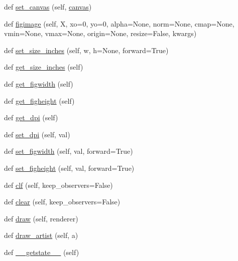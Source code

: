 \begin{DoxyCompactItemize}
\item 
def \hyperlink{classmatplotlib_1_1figure_1_1Figure_ae790b7597cbfc315342cb8dea251271a}{set\+\_\+canvas} (self, \hyperlink{classmatplotlib_1_1figure_1_1Figure_abd36f8a6998214bd3c5a359b3fed0996}{canvas})
\item 
def \hyperlink{classmatplotlib_1_1figure_1_1Figure_a4fbf405fa7586b7026a2e7e94e192c6d}{figimage} (self, X, xo=0, yo=0, alpha=None, norm=None, cmap=None, vmin=None, vmax=None, origin=None, resize=False, kwargs)
\item 
def \hyperlink{classmatplotlib_1_1figure_1_1Figure_acebcf6b8f7b0378bdd68154eb99520b2}{set\+\_\+size\+\_\+inches} (self, w, h=None, forward=True)
\item 
def \hyperlink{classmatplotlib_1_1figure_1_1Figure_a01114d214b48279bb5b81d89f0874d18}{get\+\_\+size\+\_\+inches} (self)
\item 
def \hyperlink{classmatplotlib_1_1figure_1_1Figure_a0a927243f15925482c1989829f9cfa5f}{get\+\_\+figwidth} (self)
\item 
def \hyperlink{classmatplotlib_1_1figure_1_1Figure_a04561b8cd81fbdc15ddccd20e8d8893e}{get\+\_\+figheight} (self)
\item 
def \hyperlink{classmatplotlib_1_1figure_1_1Figure_a8b61c446899e78d84ab5ac953af96805}{get\+\_\+dpi} (self)
\item 
def \hyperlink{classmatplotlib_1_1figure_1_1Figure_ac09795a9f5c841bb847e4bb96d47ac72}{set\+\_\+dpi} (self, val)
\item 
def \hyperlink{classmatplotlib_1_1figure_1_1Figure_af34fc85031256b1c3fa752afc251a5e1}{set\+\_\+figwidth} (self, val, forward=True)
\item 
def \hyperlink{classmatplotlib_1_1figure_1_1Figure_ab39f18d7d3404de2baeaac109d4645a0}{set\+\_\+figheight} (self, val, forward=True)
\item 
def \hyperlink{classmatplotlib_1_1figure_1_1Figure_a2da4c35a0821ec608dc516a2cfeb6718}{clf} (self, keep\+\_\+observers=False)
\item 
def \hyperlink{classmatplotlib_1_1figure_1_1Figure_ad1179d56d2353a3c946640341b349510}{clear} (self, keep\+\_\+observers=False)
\item 
def \hyperlink{classmatplotlib_1_1figure_1_1Figure_a4279527ad650fee5be6f271275a19e4b}{draw} (self, renderer)
\item 
def \hyperlink{classmatplotlib_1_1figure_1_1Figure_acbb6d104c4c35cd60d29a44a343a0ea2}{draw\+\_\+artist} (self, a)
\item 
def \hyperlink{classmatplotlib_1_1figure_1_1Figure_ac2d1f9ae1de3eaee62915daaa63abc96}{\+\_\+\+\_\+getstate\+\_\+\+\_\+} (self)

\end{DoxyCompactItemize}
